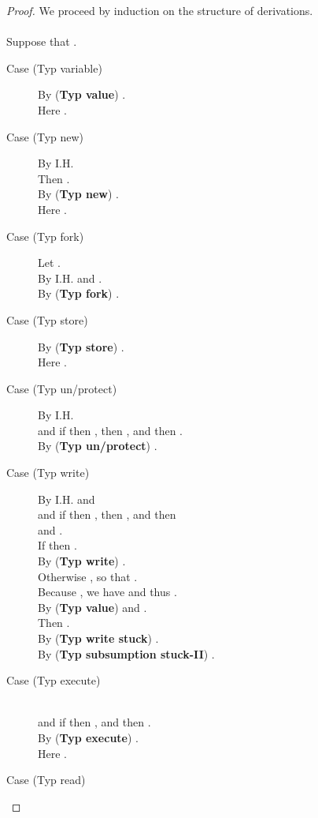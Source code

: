 \documentclass{sigplanconf}
\newcommand{\trule}[1]{(\textbf{Typ #1})}
\begin{document}
\begin{proof} We proceed by induction on the structure of derivations.\\
\\
Suppose that .
\begin{description}
\item[Case (Typ variable)] 

By \trule{value} .\\
Here .\\
\item[Case (Typ new)]

By I.H. \\
Then .\\
By \trule{new} .\\
Here .\\
\item[Case (Typ fork)]

Let .\\
By I.H.  and .\\
By \trule{fork} .\\
\item[Case (Typ store)]

By \trule{store} .\\
Here .\\
\item[Case (Typ un/protect)]

By I.H. \\
and if  then , then , and then .\\
By \trule{un/protect} .\\
\item[Case (Typ write)]

By I.H.  and \\
and if  then , then , and then \\
and .\\
If  then .\\
 By \trule{write} .\\
Otherwise , so that .\\
 Because , we have  and thus .\\
 By \trule{value}  and .\\
 Then .\\
 By \trule{write stuck} . \\
 By \trule{subsumption stuck-II} 
 . \\
\item[Case (Typ execute)]

\\
and if  then , and then .\\
By \trule{execute} .\\
Here .\\
\item[Case (Typ read)]


\end{description}
\end{proof}
\end{document}
